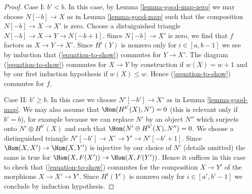 \begin{proof}
\medskip\noindent
Case I: $b' < b$. In this case, by Lemma \ref{lemma-good-map-zero}
we may choose $N[-b] \to X$ as in Lemma \ref{lemma-good-map}
such that the composition $N[-b] \to X \to X'$ is zero.
Choose a distuiguished triangle $N[-b] \to X \to Y \to N[-b + 1]$. Since
$N[-b] \to X'$ is zero, we find that $f$ factors
as $X \to Y \to X'$. Since $H^i(Y)$ is nonzero only for $i \in [a, b - 1]$
we see by induction that (\ref{equation-to-show}) commutes for
$Y \to X'$. The diagram (\ref{equation-to-show}) commutes for
$X \to Y$ by construction if $w(X) = w + 1$ and by our first
induction hypothesis if $w(X) \leq w$.
Hence (\ref{equation-to-show}) commutes for $f$.

\medskip\noindent
Case II: $b' \geq b$. In this case we choose $N'[-b'] \to X'$
as in Lemma \ref{lemma-good-map}.
We may also assume that $\Hom(H^{b'}(X), N') = 0$ (this is
relevant only if $b' = b$), for example because we can
replace $N'$ by an object $N''$ which surjects onto $N' \oplus H^{b'}(X)$
and such that $\Hom(N' \oplus H^{b'}(X), N'') = 0$.
We choose a distinguished triangle
$N'[-b'] \to X' \to Y' \to N'[-b' + 1]$. Since
$\Hom(X, X') \to \Hom(X, Y')$ is injective by our choice of $N'$
(details omitted) the same is true for
$\Hom(X, F(X')) \to \Hom(X, F(Y'))$.
Hence it suffices in this case to check that
(\ref{equation-to-show}) commutes for the composition $X \to Y'$
of the morphisms $X \to X' \to Y'$.
Since $H^i(Y')$ is nonzero only for $i \in [a', b' - 1]$
we conclude by induction hypothesis.
\end{proof}
